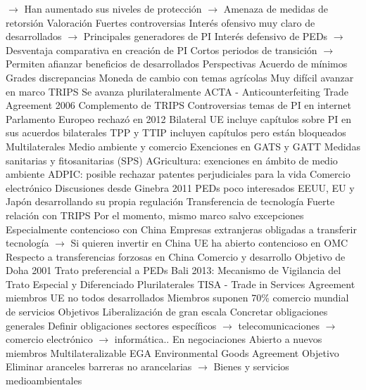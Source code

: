 \documentclass{nuevotema}
\begin{document}
\begin{esquemal}
				\4[] $\to$ Han aumentado sus niveles de protección
				\4[] $\to$ Amenaza de medidas de retorsión
			\3 Valoración
				\4 Fuertes controversias
				\4[] Interés ofensivo muy claro de desarrollados
				\4[] $\to$ Principales generadores de PI
				\4[] Interés defensivo de PEDs
				\4[] $\to$ Desventaja comparativa en creación de PI
				\4[] Cortos periodos de transición
				\4[] $\to$ Permiten afianzar beneficios de desarrollados
			\3 Perspectivas
				\4 Acuerdo de mínimos
				\4 Grades discrepancias
				\4 Moneda de cambio con temas agrícolas
				\4[$\to$] Muy difícil avanzar en marco TRIPS
				\4 Se avanza plurilateralmente
				\4[$\to$] ACTA - Anticounterfeiting Trade Agreement 2006
				\4[] Complemento de TRIPS
				\4[] Controversias temas de PI en internet
				\4[] Parlamento Europeo rechazó en 2012
				\4[$\to$] Bilateral
				\4[] UE incluye capítulos sobre PI en sus acuerdos bilaterales
				\4[] TPP y TTIP incluyen capítulos pero están bloqueados
	\1 
		\2 Multilaterales
			\3 Medio ambiente y comercio
				\4 Exenciones en GATS y GATT
				\4 Medidas sanitarias y fitosanitarias (SPS)
				\4 AGricultura: exenciones en ámbito de medio ambiente
				\4 ADPIC: posible rechazar patentes perjudiciales para la vida
			\3 Comercio electrónico
				\4 Discusiones desde Ginebra 2011
				\4 PEDs poco interesados
				\4 EEUU, EU y Japón desarrollando su propia regulación
			\3 Transferencia de tecnología
				\4 Fuerte relación con TRIPS
				\4 Por el momento, mismo marco salvo excepciones
				\4 Especialmente contencioso con China
				\4 Empresas extranjeras obligadas a transferir tecnología
				\4[] $\to$ Si quieren invertir en China
				\4 UE ha abierto contencioso en OMC
				\4[] Respecto a transferencias forzosas en China
			\3 Comercio y desarrollo
				\4 Objetivo de Doha 2001
				\4[] Trato preferencial a PEDs
				\4 Bali 2013:
				\4[] Mecanismo de Vigilancia del Trato Especial y Diferenciado
		\2 Plurilaterales
			\3 TISA - Trade in Services Agreement
				 miembros
				\4[] UE
				\4[] no todos desarrollados
				\4[] Miembros suponen 70\% comercio mundial de servicios
				\4 Objetivos
				\4[] Liberalización de gran escala
				\4[] Concretar obligaciones generales
				\4[] Definir obligaciones sectores específicos
				\4[] $\to$ telecomunicaciones
				\4[] $\to$ comercio electrónico
				\4[] $\to$ informática..
				\4 En negociaciones
				\4[] Abierto a nuevos miembros
				\4[] Multilateralizable
			\3 EGA
				\4 Environmental Goods Agreement
				\4 Objetivo
				\4[] Eliminar aranceles
				\4[] barreras no arancelarias
				\4[] $\to$ Bienes y servicios medioambientales

\end{esquemal}
\end{document}
